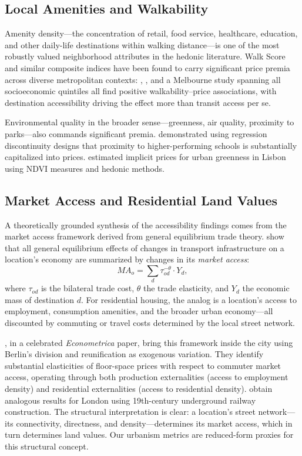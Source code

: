 \documentclass[12pt,a4paper]{article}
\begin{document}
\subsection{Local Amenities and Walkability}
\label{sec:lit_amenity}

Amenity density—the concentration of retail, food service, healthcare,
education, and other daily-life destinations within walking distance—is one of
the most robustly valued neighborhood attributes in the hedonic literature.
Walk Score and similar composite indices have been found to carry significant
price premia across diverse metropolitan contexts: \citet{pivo2011},
\citet{li2015}, and a Melbourne study spanning all socioeconomic quintiles all
find positive walkability–price associations, with destination accessibility
driving the effect more than transit access per se.

Environmental quality in the broader sense—greenness, air quality, proximity
to parks—also commands significant premia.  \citet{black1999} demonstrated
using regression discontinuity designs that proximity to higher-performing
schools is substantially capitalized into prices.  \citet{franco2018} estimated
implicit prices for urban greenness in Lisbon using NDVI measures and hedonic
methods.

\subsection{Market Access and Residential Land Values}
\label{sec:lit_ma}

A theoretically grounded synthesis of the accessibility findings comes from the
market access framework derived from general equilibrium trade theory.
\citet{donaldson2016} show that all general equilibrium effects of changes in
transport infrastructure on a location's economy are summarized by changes in
its \textit{market access}:
\begin{equation}
  MA_o = \sum_d \tau_{od}^{-\theta} \cdot Y_d,
\end{equation}
where $\tau_{od}$ is the bilateral trade cost, $\theta$ the trade elasticity,
and $Y_d$ the economic mass of destination $d$.  For residential housing, the
analog is a location's access to employment, consumption amenities, and the
broader urban economy—all discounted by commuting or travel costs determined
by the local street network.

\citet{ahlfeldt2015}, in a celebrated \textit{Econometrica} paper, bring this
framework inside the city using Berlin's division and reunification as exogenous
variation.  They identify substantial elasticities of floor-space prices with
respect to commuter market access, operating through both production
externalities (access to employment density) and residential externalities
(access to residential density).  \citet{heblich2020} obtain analogous results
for London using 19th-century underground railway construction.  The structural
interpretation is clear: a location's street network—its connectivity,
directness, and density—determines its market access, which in turn determines
land values.  Our urbanism metrics are reduced-form proxies for this structural
concept.
\end{document}
